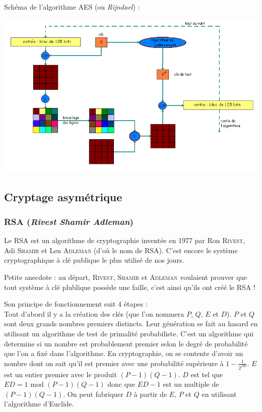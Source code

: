 \documentclass[a4paper,12pt]{article}
\begin{document}
Schéma de l'algorithme AES (ou \emph{Rijndael}) :

\begin{center}
  \includegraphics[width=\textwidth]{../Image/aes.png}
\end{center}


\subsection{Cryptage asymétrique}

\subsubsection{RSA (\emph{Rivest Shamir Adleman})}

Le RSA est un algorithme de cryptographie inventée en 1977 par  Ron \textsc{Rivest}, Adi \textsc{Shamir} et Len \textsc{Adleman} (d'où le nom de RSA). C'est encore le système cryptographique à clé publique le plus utilisé de nos jours.

Petite anecdote : au départ, \textsc{Rivest}, \textsc{Shamir} et \textsc{Adleman} voulaient prouver que tout système à clé plublique possède une faille, c'est ainsi qu'ils ont créé le RSA !

Son principe de fonctionnement suit 4 étapes :\\
Tout d'abord il y a la création des clés (que l'on nommera $P$, $Q$, $E$ et $D$). $P$ et $Q$ sont deux grands nombres premiers distincts. Leur génération se fait au hasard en utilisant un algorithme de test de primalité probabiliste. C'est un algorithme qui determine si un nombre est probablement premier selon le degré de probabilité que l'on a fixé dans l'algorithme. En cryptographie, on se \og contente \fg{} d'avoir un nombre dont on sait qu'il est premier avec une probabilité supérieure à $ 1 - \frac{1}{2^{100}} $. $E$ est un entier premier avec le produit $(P - 1)(Q - 1)$. $D$ est tel que $ED = 1 \textrm{ mod } (P - 1)(Q - 1)$ donc que $ED - 1$ est un multiple de $(P - 1)(Q - 1)$. On peut fabriquer $D$ à partir de $E$, $P$ et $Q$ en utilisant l'algorithme d'Euclide.
\end{document}
